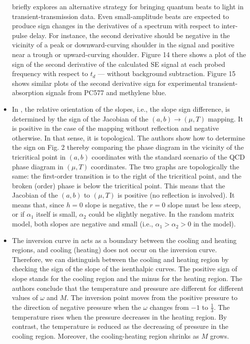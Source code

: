 \documentclass[11pt]{book}
\begin{document}
\begin{itemize}
briefly explores an alternative strategy for bringing quantum beats
to light in transient-transmission data. Even small-amplitude beats
are expected to produce sign changes in the derivatives of a spectrum
with respect to inter-pulse delay. For instance, the second derivative
should be negative in the vicinity of a peak or downward-curving shoulder
in the signal and positive near a trough or upward-curving shoulder.
Figure 14 there shows a plot of the sign of the second derivative
of the calculated SE signal at each probed frequency with respect
to $t_{d}$ --- without background subtraction. Figure 15 shows similar
plots of the second derivative sign for experimental transient-absorption
signals from PC577 and methylene blue.
\item In \cite{pradeep2019universality},
the relative orientation of the slopes, i.e., the slope sign difference,
is determined by the sign of the Jacobian of the $\left(a,b\right)\rightarrow\left(\mu,T\right)$
mapping. It is positive in the case of the mapping without reflection
and negative otherwise. In that sense, it is topological. The authors
show how to determine the sign on Fig. 2 thereby comparing the phase
diagram in the vicinity of the tricritical point in $\left(a,b\right)$
coordinates with the standard scenario of the QCD phase diagram in
$\left(\mu,T\right)$ coordinates. The two graphs are topologically
the same: the first-order transition is to the right of the tricritical
point, and the broken (order) phase is below the tricritical point.
This means that the Jacobian of the $\left(a,b\right)$ to $\left(\mu,T\right)$
is positive (no reflection is involved). It means that, since $h=0$
slope is negative, the $r=0$ slope must be less steep, or if $\alpha_{1}$
itself is small, $\alpha_{2}$ could be slightly negative. In the
random matrix model, both slopes are negative and small (i.e., $\alpha_{1}>\alpha_{2}>0$
in the model).
\item The inversion curve in \cite{abdusattar2021joule}
acts as a boundary between the cooling and heating regions, and cooling
(heating) does not occur on the inversion curve. Therefore, we can
distinguish between the cooling and heating region by checking the
sign of the slope of the isenthalpic curves. The positive sign of
slope stands for the cooling region and the minus for the heating
region. The authors conclude that the temperature and pressure are
different for different values of $\omega$ and $M$. The inversion
point moves from the positive pressure to the direction of negative
pressure when the $\omega$ changes from $-1$ to $\frac{1}{3}$.
The temperature rises when the pressure decreases in the heating region.
By contrast, the temperature is reduced as the decreasing of pressure
in the cooling region. Moreover, the cooling-heating region shrinks
as $M$ grows.
\end{itemize}
\end{document}
